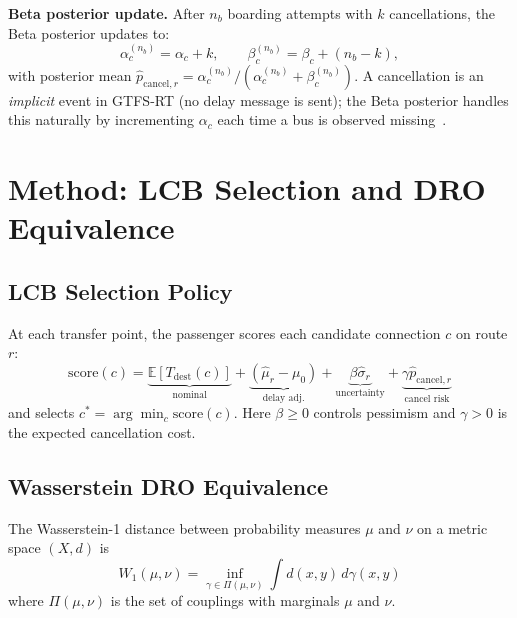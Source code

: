 \documentclass[11pt]{article}
\theoremstyle{definition}
\theoremstyle{remark}
\begin{document}
\textbf{Beta posterior update.}
After $n_b$ boarding attempts with $k$ cancellations, the Beta posterior updates to:
\begin{equation}
    \alpha_c^{(n_b)} = \alpha_c + k, \qquad
    \beta_c^{(n_b)} = \beta_c + (n_b - k),
    \label{eq:beta_update}
\end{equation}
with posterior mean
$\hat{p}_{\mathrm{cancel},r} = \alpha_c^{(n_b)}/(\alpha_c^{(n_b)} + \beta_c^{(n_b)})$.
A cancellation is an \emph{implicit} event in GTFS-RT (no delay message is sent);
the Beta posterior handles this naturally by incrementing $\alpha_c$ each time
a bus is observed missing~\cite{adams2007}.

\section{Method: LCB Selection and DRO Equivalence}
\label{sec:method}

\subsection{LCB Selection Policy}

At each transfer point, the passenger scores each candidate connection $c$ on route $r$:
\begin{equation}
    \text{score}(c) = \underbrace{\mathbb{E}[\!T_{\mathrm{dest}}(c)\!]}_{\text{nominal}} + \underbrace{(\hat{\mu}_r - \mu_0)}_{\text{delay adj.}} + \underbrace{\beta \hat{\sigma}_r}_{\text{uncertainty}} + \underbrace{\gamma \hat{p}_{\mathrm{cancel},r}}_{\text{cancel risk}}
    \label{eq:lcb}
\end{equation}
and selects $c^* = \arg\min_c \text{score}(c)$. Here $\beta \geq 0$ controls pessimism and $\gamma > 0$ is the expected cancellation cost.

\subsection{Wasserstein DRO Equivalence}

The Wasserstein-1 distance between probability measures $\mu$ and $\nu$ on a metric space $(X, d)$ is
\begin{equation}
    W_1(\mu, \nu) = \inf_{\gamma \in \Pi(\mu,\nu)} \int d(x,y)\, d\gamma(x,y)
    \label{eq:W1}
\end{equation}
where $\Pi(\mu,\nu)$ is the set of couplings with marginals $\mu$ and $\nu$.
\end{document}
